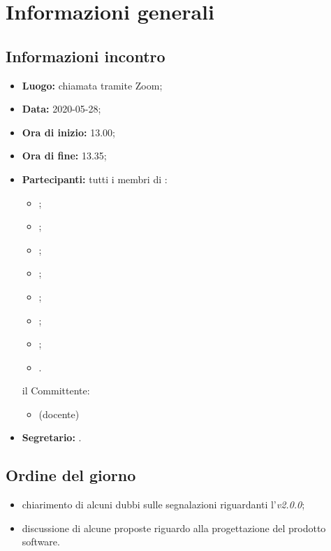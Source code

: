 \section{Informazioni generali}
\subsection{Informazioni incontro}
\begin{itemize}
	\item \textbf{Luogo:} chiamata tramite Zoom;
	\item \textbf{Data:} 2020-05-28;
	\item \textbf{Ora di inizio:} 13.00;
	\item \textbf{Ora di fine:} 13.35;
	\item \textbf{Partecipanti:}
		tutti i membri di \Gruppo:
		\begin{itemize}
			\item \VB;
			\item \LB;
			\item \NF;
			\item \EG;
			\item \FJ;
			\item \MP;
			\item \AS;
			\item \AZ.
		\end{itemize}
		il Committente:
		\begin{itemize}
			\item \RC{} (docente)
		\end{itemize}
	\item \textbf{Segretario:} \VB.
\end{itemize}

\subsection{Ordine del giorno}
\begin{itemize}
	\item chiarimento di alcuni dubbi sulle segnalazioni riguardanti l'\AdR{}\textit{v2.0.0};
	\item discussione di alcune proposte riguardo alla progettazione del prodotto software.
\end{itemize}
